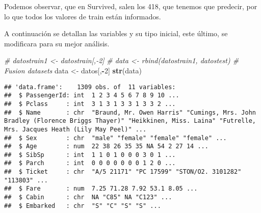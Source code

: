 \documentclass[]{article}
\newenvironment{Shaded}{\begin{snugshade}}{\end{snugshade}}
\newcommand{\KeywordTok}[1]{\textcolor[rgb]{0.13,0.29,0.53}{\textbf{#1}}}
\newcommand{\DataTypeTok}[1]{\textcolor[rgb]{0.13,0.29,0.53}{#1}}
\newcommand{\DecValTok}[1]{\textcolor[rgb]{0.00,0.00,0.81}{#1}}
\newcommand{\StringTok}[1]{\textcolor[rgb]{0.31,0.60,0.02}{#1}}
\newcommand{\CommentTok}[1]{\textcolor[rgb]{0.56,0.35,0.01}{\textit{#1}}}
\newcommand{\OperatorTok}[1]{\textcolor[rgb]{0.81,0.36,0.00}{\textbf{#1}}}
\newcommand{\NormalTok}[1]{#1}
\begin{document}
Podemos observar, que en Survived, salen los 418, que tenemos que
predecir, por lo que todos los valores de train están informados.

A continuación se detallan las variables y su tipo inicial, este último,
se modificara para su mejor análisis.

\begin{Shaded}
\begin{Highlighting}[]
\CommentTok{# datostrain1 <- datostrain[,-2]}
\CommentTok{# data <- rbind(datostrain1, datostest) # Fusion datasets}
\NormalTok{data <-}\StringTok{ }\NormalTok{datos[,}\OperatorTok{-}\DecValTok{2}\NormalTok{]}
\KeywordTok{str}\NormalTok{(data)}
\end{Highlighting}
\end{Shaded}

\begin{verbatim}
## 'data.frame':    1309 obs. of  11 variables:
##  $ PassengerId: int  1 2 3 4 5 6 7 8 9 10 ...
##  $ Pclass     : int  3 1 3 1 3 3 1 3 3 2 ...
##  $ Name       : chr  "Braund, Mr. Owen Harris" "Cumings, Mrs. John Bradley (Florence Briggs Thayer)" "Heikkinen, Miss. Laina" "Futrelle, Mrs. Jacques Heath (Lily May Peel)" ...
##  $ Sex        : chr  "male" "female" "female" "female" ...
##  $ Age        : num  22 38 26 35 35 NA 54 2 27 14 ...
##  $ SibSp      : int  1 1 0 1 0 0 0 3 0 1 ...
##  $ Parch      : int  0 0 0 0 0 0 0 1 2 0 ...
##  $ Ticket     : chr  "A/5 21171" "PC 17599" "STON/O2. 3101282" "113803" ...
##  $ Fare       : num  7.25 71.28 7.92 53.1 8.05 ...
##  $ Cabin      : chr  NA "C85" NA "C123" ...
##  $ Embarked   : chr  "S" "C" "S" "S" ...
\end{verbatim}

\begin{Shaded}
\end{Shaded}
\end{document}
